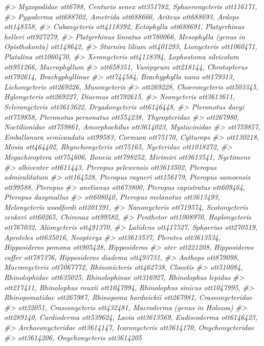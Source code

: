 \documentclass[]{article}
\newenvironment{Shaded}{\begin{snugshade}}{\end{snugshade}}
\newcommand{\CommentTok}[1]{\textcolor[rgb]{0.56,0.35,0.01}{\textit{#1}}}
\begin{document}
\begin{Shaded}
\begin{Highlighting}[]
\CommentTok{#> Myzopodidae ott6788, Centurio senex ott351782, Sphaeronycteris ott116171,}
\CommentTok{#> Pygoderma ott688702, Ametrida ott688666, Ariteus ott688693, Ardops ott148558,}
\CommentTok{#> Cubanycteris ott4118392, Ectophylla ott688691, Platyrrhinus helleri ott927279,}
\CommentTok{#> Platyrrhinus lineatus ott780066, Mesophylla (genus in Opisthokonta) ott148642,}
\CommentTok{#> Sturnira lilium ott401293, Lionycteris ott1060471, Platalina ott1060470,}
\CommentTok{#> Xeronycteris ott4118394, Lophostoma silvicolum ott951266, Macrophyllum}
\CommentTok{#> ott658351, Vampyrum ott218144, Chrotopterus ott792614, Brachyphyllinae}
\CommentTok{#> ott744584, Brachyphylla nana ott179313, Lichonycteris ott269226, Musonycteris}
\CommentTok{#> ott269228, Choeronycteris ott503345, Hylonycteris ott269227, Diaemus ott792615,}
\CommentTok{#> Neonycteris ott3613611, Scleronycteris ott3613622, Dryadonycteris ott6146448,}
\CommentTok{#> Pteronotus davyi ott759858, Pteronotus personatus ott554238, Thyropteridae}
\CommentTok{#> ott267980, Noctilionidae ott759861, Amorphochilus ott3614023, Mystacinidae}
\CommentTok{#> ott759857, Emballonura semicaudata ott99583, Cormura ott75170, Cyttarops}
\CommentTok{#> ott130218, Mosia ott464402, Rhynchonycteris ott75165, Nycteridae ott1018272,}
\CommentTok{#> Megachiroptera ott754606, Boneia ott798252, Mirimiri ott3613541, Nyctimene}
\CommentTok{#> albiventer ott611443, Pteropus pelewensis ott3613502, Pteropus admiralitatum}
\CommentTok{#> ott164528, Pteropus rayneri ott156179, Pteropus samoensis ott99588, Pteropus}
\CommentTok{#> anetianus ott673800, Pteropus capistratus ott609464, Pteropus dasymallus}
\CommentTok{#> ott608040, Pteropus melanotus ott3613493, Melonycteris woodfordi ott201391,}
\CommentTok{#> Nanonycteris ott719574, Scotonycteris zenkeri ott60265, Chironax ott99582,}
\CommentTok{#> Penthetor ott1008970, Haplonycteris ott767032, Alionycteris ott491370,}
\CommentTok{#> Latidens ott417527, Sphaerias ott270519, Aproteles ott635016, Neopteryx}
\CommentTok{#> ott3613537, Plerotes ott3613534, Hipposideros pomona ott905428, Hipposideros}
\CommentTok{#> ater ott221208, Hipposideros caffer ott787376, Hipposideros diadema ott493731,}
\CommentTok{#> Anthops ott879098, Macronycteris ott7067772, Rhinonicteris ott462738, Cloeotis}
\CommentTok{#> ott510084, Rhinolophidae ott635025, Rhinolophinae ott316927, Rhinolophus lepidus}
\CommentTok{#> ott217411, Rhinolophus rouxii ott1047994, Rhinolophus sinicus ott1047995,}
\CommentTok{#> Rhinopomatidae ott267987, Rhinopoma hardwickii ott267981, Craseonycteridae}
\CommentTok{#> ott32051, Craseonycteris ott432481, Macroderma (genus in Holozoa)}
\CommentTok{#> ott289140, Cardioderma ott539624, Lavia ott3613569, Eudiscoderma ott6146423,}
\CommentTok{#> Archaeonycteridae ott3614147, Icaronycteris ott3614170, Onychonycteridae}
\CommentTok{#> ott3614206, Onychonycteris ott3614205}


\end{Highlighting}
\end{Shaded}
\end{document}
